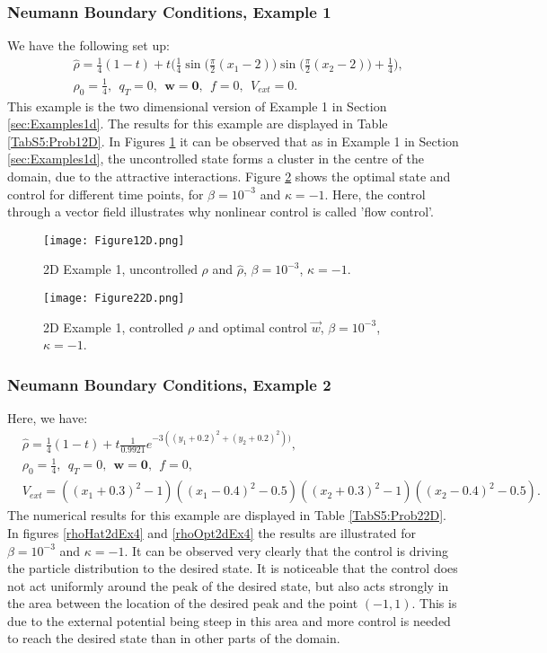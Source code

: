 \subsubsection{Neumann Boundary Conditions, Example 1}	
We have the following set up:
\begin{align*}
&\widehat \rho = \frac{1}{4}(1-t) + t\bigg(\frac{1}{4}\sin \bigg(\frac{\pi}{2}(x_1 - 2)\bigg)\sin \bigg(\frac{\pi}{2}(x_2 - 2)\bigg) + \frac{1}{4}\bigg),\\
&\rho_0 = \frac{1}{4},\ \
q_{T} = 0,\ \
\mathbf{w} = \mathbf{0},\ \
f =0,\ \
V_{ext} =0.
\end{align*}
This example is the two dimensional version of Example 1 in Section \ref{sec:Examples1d}. The results for this example are displayed in Table \ref{TabS5:Prob12D}. In Figures \ref{rhoHat2dEx2} it can be observed that as in Example 1 in Section \ref{sec:Examples1d}, the uncontrolled state forms a cluster in the centre of the domain, due to the attractive interactions. Figure \ref{rhoOpt2dEx2} shows the optimal state and control for different time points, for $\beta = 10^{-3}$ and $\kappa = -1$. Here, the control through a vector field illustrates why nonlinear control is called 'flow control'. 


\begin{figure}[h]
	\texttt{[image: Figure12D.png]}
	\caption{2D Example 1, uncontrolled $\rho$ and $\widehat \rho$, $\beta = 10^{-3}$, $\kappa = -1$.}
	\label{rhoHat2dEx2}
\end{figure}
\begin{figure}[h]
	\texttt{[image: Figure22D.png]}
	\caption{2D Example 1, controlled $\rho$ and optimal control $\vec{w}$, $\beta = 10^{-3}$, $\kappa = -1$.}
	\label{rhoOpt2dEx2}
\end{figure}


\subsubsection{Neumann Boundary Conditions, Example 2}	
Here, we have:
\begin{align*}
&\widehat \rho = \frac{1}{4}(1-t) + t\frac{1}{0.9921}e^{-3((y_1+0.2)^2 + (y_2+0.2)^2))},\\
&\rho_0 = \frac{1}{4},\ \
q_{T} = 0,\ \
\mathbf{w} = \mathbf{0},\ \
f =0,\\
&V_{ext} =\left((x_1 + 0.3)^2 - 1\right)\left((x_1-0.4)^2 - 0.5\right)
\left((x_2 + 0.3)^2 - 1\right)\left((x_2-0.4)^2 - 0.5\right).
\end{align*}
The numerical results for this example are displayed in Table \ref{TabS5:Prob22D}. In figures \ref{rhoHat2dEx4} and \ref{rhoOpt2dEx4} the results are illustrated for $\beta = 10^{-3}$ and $\kappa = -1$. It can be observed very clearly that the control is driving the particle distribution to the desired state. It is noticeable that the control does not act uniformly around the peak of the desired state, but also acts strongly in the area between the location of the desired peak and the point $(-1,1)$. This is due to the external potential being steep in this area and more control is needed to reach the desired state than in other parts of the domain.

